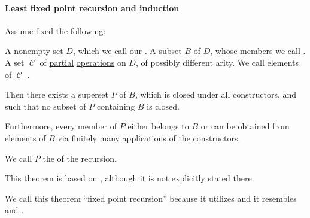\paragraph{Least fixed point recursion and induction}

\begin{theorem}\label{thm:least_fixed_point_recursion}\mimprovised
  Assume fixed the following:
  \begin{thmenum}
     A nonempty set \( D \), which we call our .
     A subset \( B \) of \( D \), whose members we call .
     A set \( \mscrC \) of \hyperref[def:set_valued_map/partial]{partial} \hyperref[def:operation_on_set]{operations} on \( D \), of possibly different arity. We call elements of \( \mscrC \) .
  \end{thmenum}

  Then there exists a superset \( P \) of \( B \), which is closed under all constructors, and such that no subset of \( P \) containing \( B \) is closed.

  Furthermore, every member of \( P \) either belongs to \( B \) or can be obtained from elements of \( B \) via finitely many applications of the constructors.

  We call \( P \) the  of the recursion.
\end{theorem}
\begin{comments}
  \item This theorem is based on \cite[ch. 8]{DaveyPriestley2002}, although it is not explicitly stated there.
  \item We call this theorem \enquote{fixed point recursion} because it utilizes  and it resembles  and .
\end{comments}
